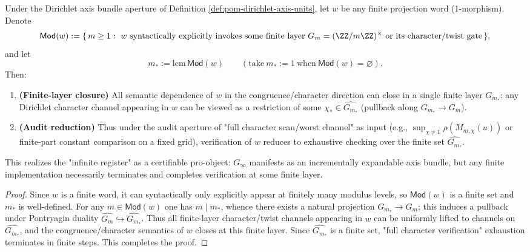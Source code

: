 \begin{proposition}\label{prop:pom-finite-modulus-stability}
Under the Dirichlet axis bundle aperture of Definition \ref{def:pom-dirichlet-axis-units}, let \(w\) be any finite projection word (1-morphism).
Denote
\[
\mathsf{Mod}(w):=\{\,m\ge 1:\ w\ \text{syntactically explicitly invokes some finite layer}\ G_m=(\ZZ/m\ZZ)^\times\ \text{or its character/twist gate}\,\},
\]
and let
\[
m_\ast:=\mathrm{lcm}\,\mathsf{Mod}(w)\qquad(\text{take}\ m_\ast:=1\ \text{when}\ \mathsf{Mod}(w)=\varnothing).
\]
Then:
\begin{enumerate}
  \item \textbf{(Finite-layer closure)} All semantic dependence of \(w\) in the congruence/character direction can close in a single finite layer \(G_{m_\ast}\): any Dirichlet character channel appearing in \(w\) can be viewed as a restriction of some \(\chi_\ast\in\widehat{G_{m_\ast}}\) (pullback along \(G_{m_\ast}\to G_m\)).
  \item \textbf{(Audit reduction)} Thus under the audit aperture of "full character scan/worst channel" as input (e.g., \(\sup_{\chi\neq 1}\rho(M_{m,\chi}(u))\) or finite-part constant comparison on a fixed grid), verification of \(w\) reduces to exhaustive checking over the finite set \(\widehat{G_{m_\ast}}\).
\end{enumerate}
This realizes the "infinite register" as a certifiable pro-object: \(G_\infty\) manifests as an incrementally expandable axis bundle, but any finite implementation necessarily terminates and completes verification at some finite layer.
\end{proposition}
\begin{proof}
Since \(w\) is a finite word, it can syntactically only explicitly appear at finitely many modulus levels, so \(\mathsf{Mod}(w)\) is a finite set and \(m_\ast\) is well-defined.
For any \(m\in\mathsf{Mod}(w)\) one has \(m\mid m_\ast\), whence there exists a natural projection \(G_{m_\ast}\to G_m\); this induces a pullback under Pontryagin duality
\(
\widehat{G_m}\hookrightarrow \widehat{G_{m_\ast}}
\).
Thus all finite-layer character/twist channels appearing in \(w\) can be uniformly lifted to channels on \(\widehat{G_{m_\ast}}\), and the congruence/character semantics of \(w\) closes at this finite layer. Since \(\widehat{G_{m_\ast}}\) is a finite set, "full character verification" exhaustion terminates in finite steps. This completes the proof.
\end{proof}

